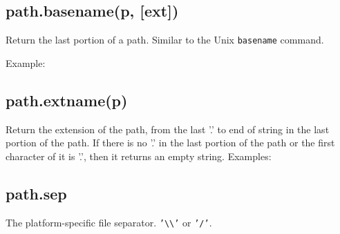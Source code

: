 \subsection{path.basename(p, {[}ext{]})}

Return the last portion of a path. Similar to the Unix \texttt{basename}
command.

Example:

\begin{Shaded}
\begin{Highlighting}[]
\NormalTok{(}\NormalTok{)}

\NormalTok{(}\NormalTok{, }\NormalTok{)}
\end{Highlighting}
\end{Shaded}

\subsection{path.extname(p)}

Return the extension of the path, from the last '.' to end of string in
the last portion of the path. If there is no '.' in the last portion of
the path or the first character of it is '.', then it returns an empty
string. Examples:

\begin{Shaded}
\begin{Highlighting}[]
\NormalTok{(}\NormalTok{)}

\NormalTok{(}\NormalTok{)}

\NormalTok{(}\NormalTok{)}
\end{Highlighting}
\end{Shaded}

\subsection{path.sep}

The platform-specific file separator.
\texttt{'\textbackslash{}\textbackslash{}'} or \texttt{'/'}.

